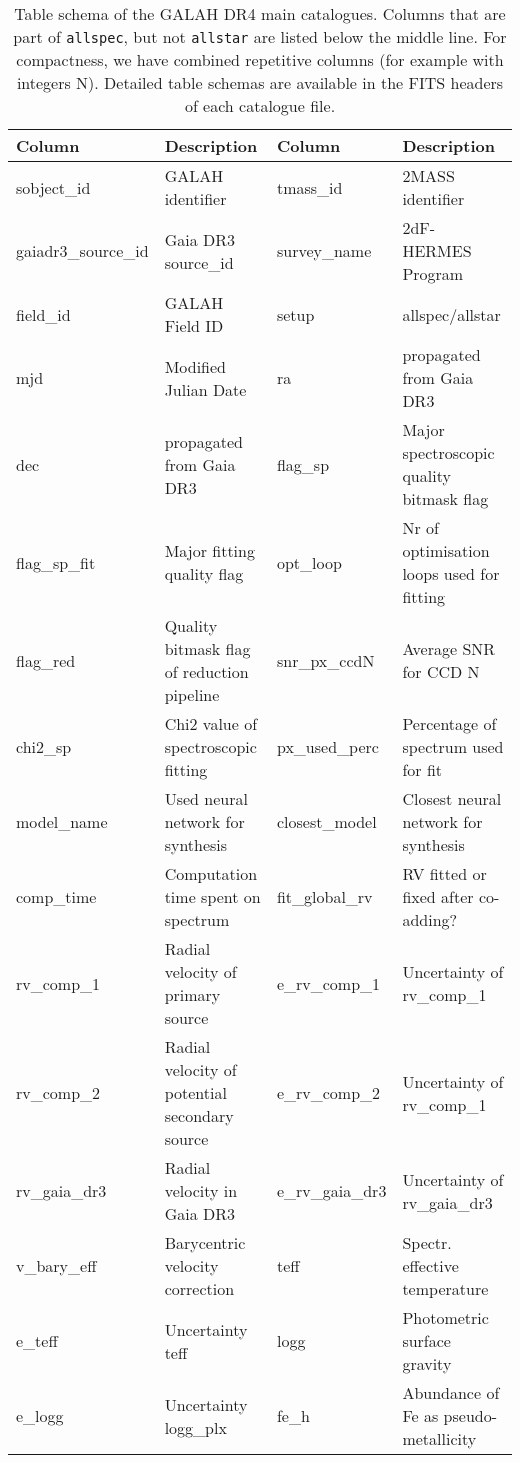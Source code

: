 \begin{table*}[ht]
\centering
\caption{Table schema of the GALAH DR4 main catalogues. Columns that are part of \texttt{allspec}, but not \texttt{allstar} are listed below the middle line. For compactness, we have combined repetitive columns (for example with integers N). Detailed table schemas are available in the FITS headers of each catalogue file.}
\label{tab:main_catalog_schema}
\begin{tabular}{llll}
\hline \hline
Column & Description & Column & Description \\
\hline
sobject\_id & GALAH identifier & tmass\_id & 2MASS identifier \\ 
gaiadr3\_source\_id & Gaia DR3 source\_id & survey\_name & 2dF-HERMES Program \\ 
field\_id & GALAH Field ID & setup & allspec/allstar \\ 
mjd & Modified Julian Date & ra & propagated from Gaia DR3 \\ 
dec & propagated from Gaia DR3 & flag\_sp & Major spectroscopic quality bitmask flag \\ 
flag\_sp\_fit & Major fitting quality flag & opt\_loop & Nr of optimisation loops used for fitting \\ 
flag\_red & Quality bitmask flag of reduction pipeline & snr\_px\_ccdN & Average SNR for CCD N \\ 
chi2\_sp & Chi2 value of spectroscopic fitting & px\_used\_perc & Percentage of spectrum used for fit \\ 
model\_name & Used neural network for synthesis & closest\_model & Closest neural network for synthesis \\ 
comp\_time & Computation time spent on spectrum & fit\_global\_rv & RV fitted or fixed after co-adding? \\ 
rv\_comp\_1 & Radial velocity of primary source & e\_rv\_comp\_1 & Uncertainty of rv\_comp\_1 \\ 
rv\_comp\_2 & Radial velocity of potential secondary source & e\_rv\_comp\_2 & Uncertainty of rv\_comp\_1 \\ 
rv\_gaia\_dr3 & Radial velocity in Gaia DR3 & e\_rv\_gaia\_dr3 & Uncertainty of rv\_gaia\_dr3 \\ 
v\_bary\_eff & Barycentric velocity correction & teff & Spectr. effective temperature \\ 
e\_teff & Uncertainty teff & logg & Photometric surface gravity \\ 
e\_logg & Uncertainty logg\_plx & fe\_h & Abundance of Fe as pseudo-metallicity \\ 

\end{tabular}
\end{table*}
